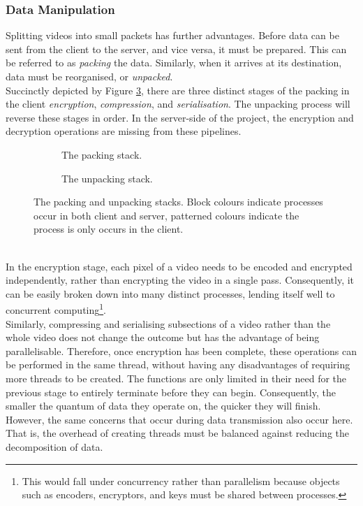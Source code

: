 \setlength{\leftskip}{0cm}
\subsubsection{Data Manipulation}
\setlength{\leftskip}{0.5cm}
\indent \indent
Splitting videos into small packets has further advantages. Before data can be sent from the client to the server, and vice versa, it must be prepared. This can be referred to as \textit{packing} the data. Similarly, when it arrives at its destination, data must be reorganised, or \textit{unpacked}.
\smallskip \\ \indent
Succinctly depicted by Figure \ref{fig:packingAndUnpacking}, there are three distinct stages of the packing in the client \textit{encryption}, \textit{compression}, and \textit{serialisation}. The unpacking process will reverse these stages in order. In the server-side of the project, the encryption and decryption operations are missing from these pipelines.
\begin{figure}[htp]
    \begin{subfigure}[b]{0.5\textwidth}
        \centering
        \scalebox{0.8}{}
        \caption{The packing stack.}
        \label{fig:packing}
    \end{subfigure}%
    \begin{subfigure}[b]{0.5\textwidth}
        \centering
        \scalebox{0.8}{}
        \caption{The unpacking stack.}
        \label{fig:unpacking}
    \end{subfigure}%
    \caption[Packing and Unpacking]{The packing and unpacking stacks. Block colours indicate processes occur in both client and server, patterned colours indicate the process is only occurs in the client.}
    \label{fig:packingAndUnpacking}
\end{figure}
\smallskip \\ \indent
In the encryption stage, each pixel of a video needs to be encoded and encrypted independently, rather than encrypting the video in a single pass. Consequently, it can be easily broken down into many distinct processes, lending itself well to concurrent computing\footnote{This would fall under concurrency rather than parallelism because objects such as encoders, encryptors, and keys must be shared between processes.}.
\smallskip \\ \indent
Similarly, compressing and serialising subsections of a video rather than the whole video does not change the outcome but has the advantage of being parallelisable. Therefore, once encryption has been complete, these operations can be performed in the same thread, without having any disadvantages of requiring more threads to be created. The functions are only limited in their need for the previous stage to entirely terminate before they can begin. Consequently, the smaller the quantum of data they operate on, the quicker they will finish. However, the same concerns that occur during data transmission also occur here. That is, the overhead of creating threads must be balanced against reducing the decomposition of data.

